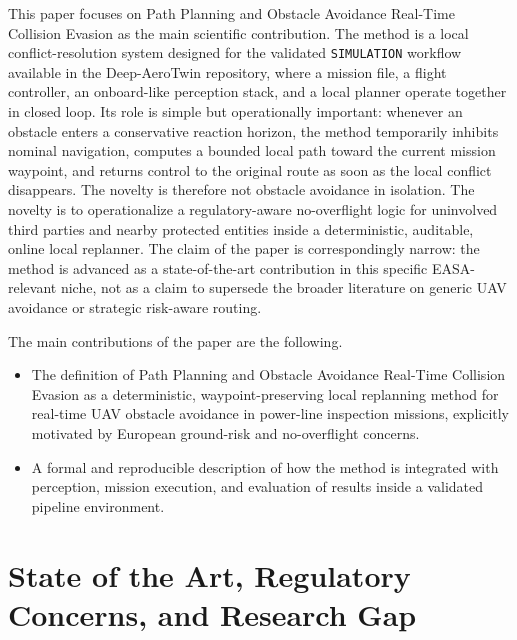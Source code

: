 \documentclass[a4paper,11pt]{article}
\begin{document}
This paper focuses on Path Planning and Obstacle Avoidance Real-Time Collision Evasion as the main scientific contribution. The method is a local conflict-resolution system designed for the validated \texttt{SIMULATION} workflow available in the Deep-AeroTwin repository, where a mission file, a flight controller, an onboard-like perception stack, and a local planner operate together in closed loop. Its role is simple but operationally important: whenever an obstacle enters a conservative reaction horizon, the method temporarily inhibits nominal navigation, computes a bounded local path toward the current mission waypoint, and returns control to the original route as soon as the local conflict disappears. The novelty is therefore not obstacle avoidance in isolation. The novelty is to operationalize a regulatory-aware no-overflight logic for uninvolved third parties and nearby protected entities inside a deterministic, auditable, online local replanner. The claim of the paper is correspondingly narrow: the method is advanced as a state-of-the-art contribution in this specific EASA-relevant niche, not as a claim to supersede the broader literature on generic UAV avoidance or strategic risk-aware routing.

The main contributions of the paper are the following.
\begin{itemize}[leftmargin=1.3em]
    \item The definition of Path Planning and Obstacle Avoidance Real-Time Collision Evasion as a deterministic, waypoint-preserving local replanning method for real-time UAV obstacle avoidance in power-line inspection missions, explicitly motivated by European ground-risk and no-overflight concerns.
    \item A formal and reproducible description of how the method is integrated with perception, mission execution, and evaluation of results inside a validated pipeline environment.
    

\end{itemize}

\section{State of the Art, Regulatory Concerns, and Research Gap}
\end{document}
